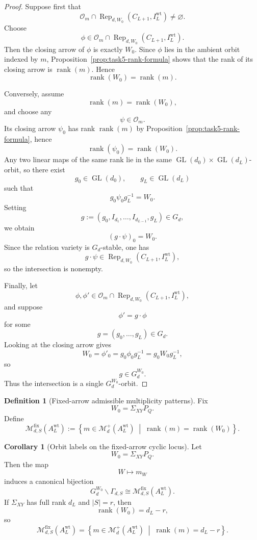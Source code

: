 \documentclass{article}
\newcommand{\rk}{\operatorname{rank}}
\newcommand{\GL}{\operatorname{GL}}
\newcommand{\Rep}{\operatorname{Rep}}
\theoremstyle{definition}
\newtheorem{corollary}[theorem]{Corollary}
\newtheorem{definition}[theorem]{Definition}
\begin{document}
\begin{proof}
Suppose first that
\[
\mathcal O_m\cap \Rep_{d,W_0}(C_{L+1},I_L^{\mathrm{wt}})\neq \varnothing.
\]
Choose
\[
\phi\in \mathcal O_m\cap \Rep_{d,W_0}(C_{L+1},I_L^{\mathrm{wt}}).
\]
Then the closing arrow of $\phi$ is exactly $W_0$. Since $\phi$ lies in the
ambient orbit indexed by $m$, Proposition~\ref{prop:task5-rank-formula} shows
that the rank of its closing arrow is $\rk(m)$. Hence
\[
\rk(W_0)=\rk(m).
\]

Conversely, assume
\[
\rk(m)=\rk(W_0),
\]
and choose any
\[
\psi\in \mathcal O_m.
\]
Its closing arrow $\psi_0$ has rank $\rk(m)$ by
Proposition~\ref{prop:task5-rank-formula}, hence
\[
\rk(\psi_0)=\rk(W_0).
\]
Any two linear maps of the same rank lie in the same
$\GL(d_0)\times \GL(d_L)$-orbit, so there exist
\[
g_0\in \GL(d_0),
\qquad
g_L\in \GL(d_L)
\]
such that
\[
g_0\psi_0g_L^{-1}=W_0.
\]
Setting
\[
g:=(g_0,I_{d_1},\dots,I_{d_{L-1}},g_L)\in G_d,
\]
we obtain
\[
(g\cdot \psi)_0=W_0.
\]
Since the relation variety is $G_d$-stable, one has
\[
g\cdot \psi\in \Rep_{d,W_0}(C_{L+1},I_L^{\mathrm{wt}}),
\]
so the intersection is nonempty.

Finally, let
\[
\phi,\phi'\in \mathcal O_m\cap \Rep_{d,W_0}(C_{L+1},I_L^{\mathrm{wt}}),
\]
and suppose
\[
\phi'=g\cdot \phi
\]
for some
\[
g=(g_0,\dots,g_L)\in G_d.
\]
Looking at the closing arrow gives
\[
W_0=\phi'_0=g_0\phi_0g_L^{-1}=g_0W_0g_L^{-1},
\]
so
\[
g\in G_d^{W_0}.
\]
Thus the intersection is a single $G_d^{W_0}$-orbit.
\end{proof}

\begin{definition}[Fixed-arrow admissible multiplicity patterns]
Fix
\[
W_0=\Sigma_{XY}P_Q.
\]
Define
\[
\mathcal M_{d,S}^{\mathrm{fix}}(A_L^{\mathrm{wt}})
:=
\left\{
m\in \mathcal M_d^+(A_L^{\mathrm{wt}})
\;\middle|\;
\rk(m)=\rk(W_0)
\right\}.
\]
\end{definition}

\begin{corollary}[Orbit labels on the fixed-arrow cyclic locus]
\label{cor:task5-fixed-arrow-orbits}
Let
\[
W_0=\Sigma_{XY}P_Q.
\]
Then the map
\[
W\longmapsto m_W
\]
induces a canonical bijection
\[
G_d^{W_0}\backslash \Gamma_{d,S}
\cong
\mathcal M_{d,S}^{\mathrm{fix}}(A_L^{\mathrm{wt}}).
\]
If $\Sigma_{XY}$ has full rank $d_L$ and $|S|=r$, then
\[
\rk(W_0)=d_L-r,
\]
so
\[
\mathcal M_{d,S}^{\mathrm{fix}}(A_L^{\mathrm{wt}})
=
\left\{
m\in \mathcal M_d^+(A_L^{\mathrm{wt}})
\;\middle|\;
\rk(m)=d_L-r
\right\}.
\]
\end{corollary}
\end{document}
